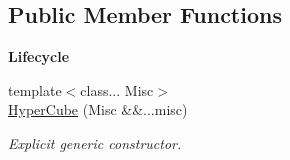 \subsection*{Public Member Functions}
\begin{Indent}{\bf Lifecycle}\par
\begin{DoxyCompactItemize}
\item 
{\footnotesize template$<$class... Misc$>$ }\\\hyperlink{exceptionmagrathea_1_1HyperCube_ab990ea0b6d11329084d0202d3e7355f6}{Hyper\-Cube} (Misc \&\&...misc)
\begin{DoxyCompactList}\small\item\em Explicit generic constructor. \end{DoxyCompactList}\end{DoxyCompactItemize}
\end{Indent}
